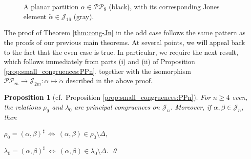 \documentclass[11pt,a4paper]{article}
\newcommand{\PP}{\mathscr{P}\P}
\renewcommand{\P}{\mathcal P}
\newcommand{\J}{\mathcal J}
\newcommand{\al}{\alpha}
\newcommand{\be}{\beta}
\newcommand{\alt}{\widetilde{\al}}
\newcommand{\cg}[2]{(#1,#2)^\sharp}
\newcommand{\1}{\id_n}
\newcommand{\mt}{\mapsto}
\newcommand{\sm}{\setminus}
\renewcommand{\iff}{\ \Leftrightarrow\ }
\newcommand{\itemit}[1]{\item[\emph{(#1)}]}
\newcommand{\epfres}{\hfill\qed}
\newcommand{\stline}[2]{\draw(#1,2)--(#2,0);}
\newcommand{\stlines}[1]{{\foreach \x/\y in {#1} { \stline{\x}{\y} }}}
\newcommand{\darcx}[3]{\draw(#1,0)arc(180:90:#3) (#1+#3,#3)--(#2-#3,#3) (#2-#3,#3) arc(90:0:#3);}
\newcommand{\uarcx}[3]{\draw(#1,2)arc(180:270:#3) (#1+#3,2-#3)--(#2-#3,2-#3) (#2-#3,2-#3) arc(270:360:#3);}
\newcommand{\darcxx}[4]{\draw[#4](#1,0)arc(180:90:#3) (#1+#3,#3)--(#2-#3,#3) (#2-#3,#3) arc(90:0:#3);}
\newcommand{\uarcxx}[4]{\draw[#4](#1,2)arc(180:270:#3) (#1+#3,2-#3)--(#2-#3,2-#3) (#2-#3,2-#3) arc(270:360:#3);}
\newcommand{\stlinex}[3]{\draw[#3](#1,2)--(#2,0);}
\numberwithin{equation}{section}
\newtheorem{prop}[equation]{Proposition}
\theoremstyle{definition}
\begin{document}
\begin{itemize}
\begin{itemize}
\begin{itemize}
\begin{itemize}
\begin{itemize}
\begin{itemize}
\begin{itemize}
\begin{figure}[ht]
\begin{center}
\end{center}
\vspace{-5mm}
\caption{A planar partition $\al\in\PP_8$ (black), with its corresponding Jones element $\alt\in\J_{16}$ (gray).}
\label{fig:PmJ2m}
\end{figure}


The proof of Theorem \ref{thm:cong-Jn} in the odd case follows the same pattern as the proofs of our previous main theorems.  At several points, we will appeal back to the fact that the even case is true.  In particular, we require the next result, which follows immediately from parts (i) and (ii) of Proposition \ref{prop:small_congruences:PPn}, together with the isomorphism $\PP_m\to\J_{2m}:\al\mt\alt$ described in the above proof.

\newpage

\begin{prop}[cf.~Proposition \ref{prop:small_congruences:PPn}]
\label{prop:rlJeven}
For $n\geq4$ even, the relations $\rho_0$ and $\lambda_0$ are principal congruences on $\J_n$.  Moreover, if $\al,\be\in\J_n$, then
\begin{itemize}\begin{multicols}{2}
\itemit{i} $\rho_0=\cg\al\be\iff (\al,\be)\in\rho_0\sm\Delta$, 
\itemit{ii} $\lambda_0=\cg\al\be\iff (\al,\be)\in\lambda_0\sm\Delta$.
\epfres
\end{multicols}\end{itemize}
\end{prop}




\end{itemize}
\end{itemize}
\end{itemize}
\end{itemize}
\end{itemize}
\end{itemize}
\end{itemize}
\end{document}
